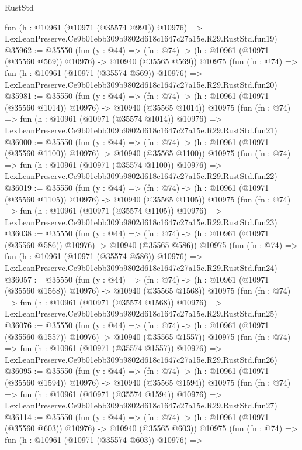 \begin{lexlean}{RustStd}
\begin{coremodule}
    fun (h : @10961 (@10971 (@35574 @991)) @10976) =>
    LexLeanPreserve.Ce9b01ebb309b9802d618c1647c27a15e.R29.RustStd.fun19)
@35962 := @35550
    (fun (y : @44) =>
    (fn : @74) -> (h : @10961 (@10971 (@35560 @569)) @10976) -> @10940 (@35565 @569))
    @10975
    (fun (fn : @74) =>
    fun (h : @10961 (@10971 (@35574 @569)) @10976) =>
    LexLeanPreserve.Ce9b01ebb309b9802d618c1647c27a15e.R29.RustStd.fun20)
@35981 := @35550
    (fun (y : @44) =>
    (fn : @74) -> (h : @10961 (@10971 (@35560 @1014)) @10976) -> @10940 (@35565 @1014))
    @10975
    (fun (fn : @74) =>
    fun (h : @10961 (@10971 (@35574 @1014)) @10976) =>
    LexLeanPreserve.Ce9b01ebb309b9802d618c1647c27a15e.R29.RustStd.fun21)
@36000 := @35550
    (fun (y : @44) =>
    (fn : @74) -> (h : @10961 (@10971 (@35560 @1100)) @10976) -> @10940 (@35565 @1100))
    @10975
    (fun (fn : @74) =>
    fun (h : @10961 (@10971 (@35574 @1100)) @10976) =>
    LexLeanPreserve.Ce9b01ebb309b9802d618c1647c27a15e.R29.RustStd.fun22)
@36019 := @35550
    (fun (y : @44) =>
    (fn : @74) -> (h : @10961 (@10971 (@35560 @1105)) @10976) -> @10940 (@35565 @1105))
    @10975
    (fun (fn : @74) =>
    fun (h : @10961 (@10971 (@35574 @1105)) @10976) =>
    LexLeanPreserve.Ce9b01ebb309b9802d618c1647c27a15e.R29.RustStd.fun23)
@36038 := @35550
    (fun (y : @44) =>
    (fn : @74) -> (h : @10961 (@10971 (@35560 @586)) @10976) -> @10940 (@35565 @586))
    @10975
    (fun (fn : @74) =>
    fun (h : @10961 (@10971 (@35574 @586)) @10976) =>
    LexLeanPreserve.Ce9b01ebb309b9802d618c1647c27a15e.R29.RustStd.fun24)
@36057 := @35550
    (fun (y : @44) =>
    (fn : @74) -> (h : @10961 (@10971 (@35560 @1568)) @10976) -> @10940 (@35565 @1568))
    @10975
    (fun (fn : @74) =>
    fun (h : @10961 (@10971 (@35574 @1568)) @10976) =>
    LexLeanPreserve.Ce9b01ebb309b9802d618c1647c27a15e.R29.RustStd.fun25)
@36076 := @35550
    (fun (y : @44) =>
    (fn : @74) -> (h : @10961 (@10971 (@35560 @1557)) @10976) -> @10940 (@35565 @1557))
    @10975
    (fun (fn : @74) =>
    fun (h : @10961 (@10971 (@35574 @1557)) @10976) =>
    LexLeanPreserve.Ce9b01ebb309b9802d618c1647c27a15e.R29.RustStd.fun26)
@36095 := @35550
    (fun (y : @44) =>
    (fn : @74) -> (h : @10961 (@10971 (@35560 @1594)) @10976) -> @10940 (@35565 @1594))
    @10975
    (fun (fn : @74) =>
    fun (h : @10961 (@10971 (@35574 @1594)) @10976) =>
    LexLeanPreserve.Ce9b01ebb309b9802d618c1647c27a15e.R29.RustStd.fun27)
@36114 := @35550
    (fun (y : @44) =>
    (fn : @74) -> (h : @10961 (@10971 (@35560 @603)) @10976) -> @10940 (@35565 @603))
    @10975
    (fun (fn : @74) =>
    fun (h : @10961 (@10971 (@35574 @603)) @10976) =>

\end{coremodule}
\end{lexlean}
